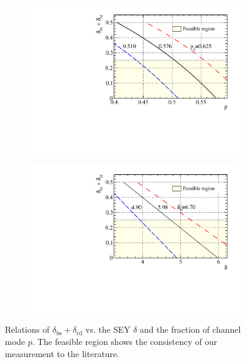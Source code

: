 \begin{figure}[!htbp]
	\centering
	\begin{subfigure}{0.48\textwidth}
		\centering
		\includegraphics[width=\linewidth]{PMTRelated/GTmodel/parameter_pp0.pdf}
		\caption{}
		\label{fig:pp0}
	\end{subfigure}
	\hfill
	\begin{subfigure}{0.48\textwidth}
		\centering
		\includegraphics[width=\linewidth]{PMTRelated/GTmodel/parameters_ts.pdf}
		\caption{}
		\label{fig:tsts}
	\end{subfigure}
	\caption{Relations of \(\delta_\text{bs} + \delta_\text{rd}\) vs. the SEY \(\delta\) and the fraction of channel mode \(p\).
		The feasible region shows the consistency of our measurement to the literature.}
	\label{fig:pdelta}
\end{figure}

